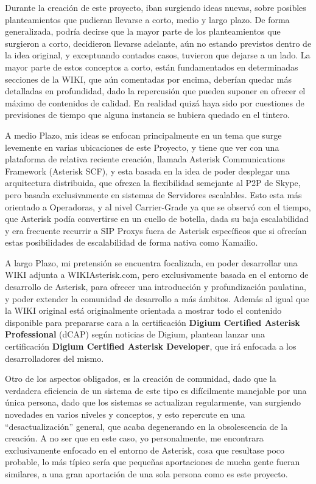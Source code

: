 Durante la creación de este proyecto, iban surgiendo ideas nuevas, sobre posibles planteamientos que pudieran llevarse a corto, medio y largo plazo. De forma generalizada, podría decirse que la mayor parte de los planteamientos que surgieron a corto, decidieron llevarse adelante, aún no estando previstos dentro de la idea original, y exceptuando contados casos, tuvieron que dejarse a un lado. La mayor parte de estos conceptos a corto, están fundamentados en determinadas secciones de la WIKI, que aún comentadas por encima, deberían quedar más detalladas en profundidad, dado la repercusión que pueden suponer en ofrecer el máximo de contenidos de calidad. En realidad quizá haya sido por cuestiones de previsiones de tiempo que alguna instancia se hubiera quedado en el tintero.

A medio Plazo, mis ideas se enfocan principalmente en un tema que surge levemente en varias ubicaciones de este Proyecto, y tiene que ver con una plataforma de relativa reciente creación, llamada Asterisk Communications Framework (Asterisk SCF), y esta basada en la idea de poder desplegar una arquitectura distribuida, que ofrezca la flexibilidad semejante al P2P de Skype, pero basada exclusivamente en sistemas de Servidores escalables. Esto esta más orientado a Operadoras, y al nivel Carrier-Grade ya que se observó con el tiempo, que Asterisk podía convertirse en un cuello de botella, dada su baja escalabilidad y era frecuente recurrir a SIP Proxys fuera de Asterisk específicos que si ofrecían estas posibilidades de escalabilidad de forma nativa como Kamailio.

A largo Plazo, mi pretensión se encuentra focalizada, en poder desarrollar una WIKI adjunta a WIKIAsterisk.com, pero exclusivamente basada en el entorno de desarrollo de Asterisk, para ofrecer una introducción y profundización paulatina, y poder extender la comunidad de desarrollo a más ámbitos. Además al igual que la WIKI original está originalmente orientada a mostrar todo el contenido disponible para prepararse cara a la certificación \textbf{Digium Certified Asterisk Professional} (dCAP) según noticias de Digium, plantean lanzar una certificación \textbf{Digium Certified Asterisk Developer}, que irá enfocada a los desarrolladores del mismo.

Otro de los aspectos obligados, es la creación de comunidad, dado que la verdadera eficiencia de un sistema de este tipo es difícilmente manejable por una única persona, dado que los sistemas se actualizan regularmente, van surgiendo novedades en varios niveles y conceptos, y esto repercute en una ``desactualización'' general, que acaba degenerando en la obsolescencia de la creación. A no ser que en este caso, yo personalmente, me encontrara exclusivamente enfocado en el entorno de Asterisk, cosa que resultase poco probable, lo más típico sería que pequeñas aportaciones de mucha gente fueran similares, a una gran aportación de una sola persona como es este proyecto.

